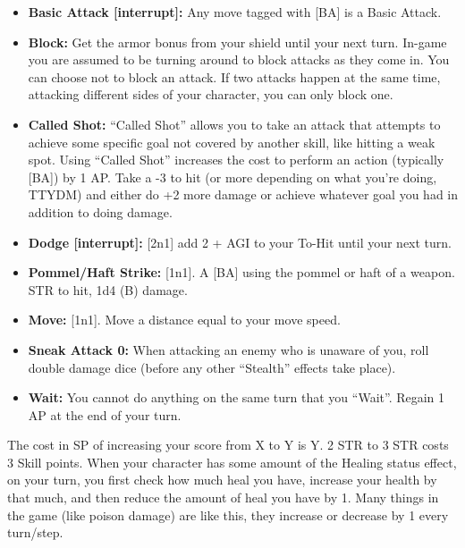 \documentclass{article}
\begin{document}
\thispagestyle{empty}
\setlength{\columnsep}{.1cm}

\begin{multicols}{2}
  \begin{itemize}
    \item \textbf{Basic Attack [interrupt]:} Any move tagged with [BA] is a Basic Attack.
    \item \textbf{Block:} Get the armor bonus from your shield until your next turn. In-game you are assumed to be turning around to block attacks as they come in. You can choose not to block an attack. If two attacks happen at the same time, attacking different sides of your character, you can only block one.
    \item  \textbf{Called Shot:} ``Called Shot'' allows you to take an attack that attempts to achieve some specific goal not covered by another skill, like hitting a weak spot. Using ``Called Shot'' increases the cost to perform an action (typically [BA]) by 1 AP. Take a -3 to hit (or more depending on what you’re doing, TTYDM) and either do +2 more damage or achieve whatever goal you had in addition to doing damage.
    \item \textbf{Dodge [interrupt]:} [2n1] add 2 + AGI to your To-Hit until your next turn.
    \item \textbf{Pommel/Haft Strike:} [1n1]. A [BA] using the pommel or haft of a weapon. STR to hit, 1d4 (B) damage.
    \item \textbf{Move:} [1n1]. Move a distance equal to your move speed.
    \item \textbf{Sneak Attack 0:} When attacking an enemy who is unaware of you, roll double damage dice (before any other ``Stealth'' effects take place).
    \item   \textbf{Wait:} You cannot do anything on the same turn that you ``Wait''. Regain 1 AP at the end of your turn.
  \end{itemize}



\end{multicols}




\smallskip
\begin{tcolorbox}
  The cost in SP of increasing your score from X to Y is Y. 2 STR to 3 STR costs 3 Skill points. When your character has some amount of the Healing status effect, on your turn, you first check how much heal you have, increase your health by that much, and then reduce the amount of heal you have by 1. Many things in the game (like poison damage) are like this, they increase or decrease by 1 every turn/step.
\end{tcolorbox}
\end{document}
